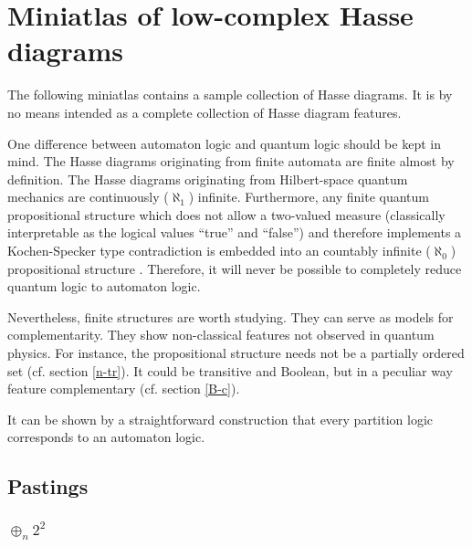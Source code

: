 \section{Miniatlas of low-complex Hasse diagrams}

The following miniatlas contains a sample collection of Hasse diagrams. It is
by no means intended as a complete collection of Hasse diagram features.

One difference between automaton logic and quantum logic should be kept
in mind. The Hasse diagrams originating from finite automata are finite
almost by definition. The Hasse diagrams originating from Hilbert-space
quantum mechanics \cite{birkhoff-36} are continuously
($\aleph_1$) infinite.
Furthermore, any finite quantum propositional structure which does not
allow a two-valued measure (classically interpretable as
the logical values ``true'' and ``false'') and therefore
implements a Kochen-Specker type contradiction is embedded
into an countably infinite ($\aleph_0$) propositional structure
\cite{svozil-tkadlec,havlicek}.
Therefore,  it will never be possible to
completely reduce quantum logic to automaton logic.

Nevertheless, finite structures are worth studying. They can serve
as models for complementarity. They show non-classical features not
observed
in quantum physics. For instance, the propositional structure needs not
be a partially ordered set  (cf. section \ref{n-tr}). It could be
transitive
and Boolean, but in a peculiar way feature complementary  (cf. section
\ref{B-c}).



It can be shown by a straightforward construction
\cite[pp. 154--155]{svozil-93} that every partition
logic corresponds to an automaton logic.


\subsection{Pastings}
\subsubsection{$\oplus_n 2^2$}


